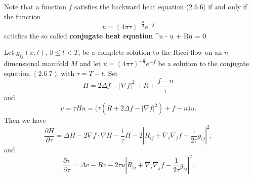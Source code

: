Note that a function $f$ satisfies the backward heat equation
(2.6.6) if and only if the function
$$
u=(4\pi \tau)^{-\frac{n}{2}}e^{- f}
$$
satisfies the so called \textbf{conjugate heat equation}
 \be \square^\ast u \triangleq
{} - \Delta
u + Ru = 0. %
\ee

\begin{lemma}
  \label{lem:cz-gradient-estimate-for-conjugate-heat-equations}
Let $g_{ij}(x,t)$, $0 \leq t < T$, be a complete solution to the
Ricci flow on an $n$-dimensional manifold $M$ and let $u=(4 \pi
\tau)^{-\frac{n}{2}} e^{-f}$ be a solution to the conjugate
equation $(2.6.7)$ with $\tau=T-t$. Set
$$
H=2 \Delta f -| \nabla f |^2 + R + \frac{f-n}{\tau}
$$
and
$$
v = \tau H u = \big(\tau(R+2 \Delta f - | \nabla f|^2)+f-n \big)
u.
$$
Then we have
$$
\frac{\partial H}{\partial \tau} = \Delta H - 2 \nabla f \cdot
\nabla H - \frac{1}{\tau} H - 2 \left| R_{ij} + \nabla_i\nabla_j f
- \frac{1}{2 \tau} g_{ij} \right|^2,
$$
and
$$
\frac{\partial v}{\partial \tau} = \Delta v - Rv - 2 \tau u
\left|R_{ij}+\nabla_i\nabla_jf - \frac{1}{2 \tau} g_{ij}\right|^2.
$$
\end{lemma}

